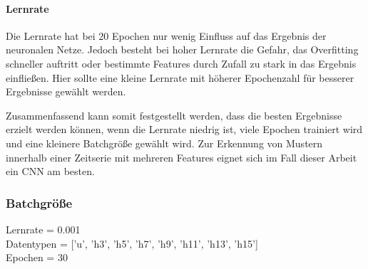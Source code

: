     \paragraph{Lernrate}
    Die Lernrate hat bei 20 Epochen nur wenig Einfluss auf das Ergebnis der neuronalen Netze.
    Jedoch besteht bei hoher Lernrate die Gefahr, das Overfitting schneller auftritt oder bestimmte Features durch Zufall zu stark in das Ergebnis einfließen.
    Hier sollte eine kleine Lernrate mit höherer Epochenzahl für besserer Ergebnisse gewählt werden.
    \newline

    \noindent
    Zusammenfassend kann somit festgestellt werden, dass die besten Ergebnisse erzielt werden können, wenn die Lernrate niedrig ist, viele Epochen trainiert wird und eine kleinere Batchgröße gewählt wird.
    Zur Erkennung von Mustern innerhalb einer Zeitserie mit mehreren Features eignet sich im Fall dieser Arbeit ein \ac{CNN} am besten.

    \subsubsection{Batchgröße}

        Lernrate = 0.001\\
        \noindent
        Datentypen = ['u', 'h3', 'h5', 'h7', 'h9', 'h11', 'h13', 'h15']\\
        \noindent
        Epochen = 30\\

